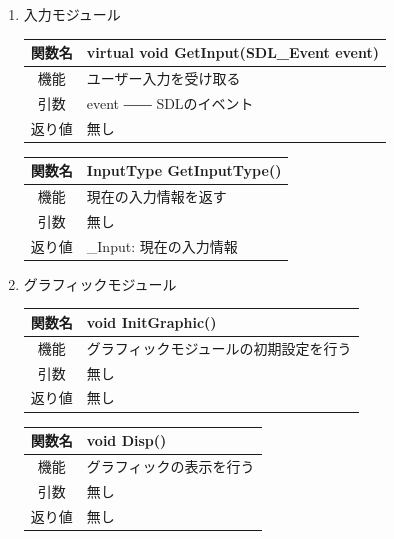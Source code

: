 \documentclass{jarticle}
\begin{document}
\begin{enumerate}
    \item 入力モジュール
    \begin{table}[H]
        \label{table:fanc_c4-1}
        \begin{center}
            \begin{tabular}{|c||p{30em}|}\hline
                関数名&virtual void GetInput(SDL\_Event event)\\\hline
                機能&ユーザー入力を受け取る\\
                引数&event ―― SDLのイベント\\
                返り値&無し\\\hline
            \end{tabular}
        \end{center}
    \end{table}
    \begin{table}[H]
        \label{table:fanc_c4-2}
        \begin{center}
            \begin{tabular}{|c||p{30em}|}\hline
                関数名&InputType GetInputType()\\\hline
                機能&現在の入力情報を返す\\
                引数&無し\\
                返り値&\_Input: 現在の入力情報\\\hline
            \end{tabular}
        \end{center}
    \end{table}
    \item グラフィックモジュール
    \begin{table}[H]
        \label{table:fanc_c5-1}
        \begin{center}
            \begin{tabular}{|c||p{30em}|}\hline
                関数名&void InitGraphic()\\\hline
                機能&グラフィックモジュールの初期設定を行う\\
                引数&無し\\
                返り値&無し\\\hline
            \end{tabular}
        \end{center}
    \end{table}
    \begin{table}[H]
        \label{table:fanc_c5-1}
        \begin{center}
            \begin{tabular}{|c||p{30em}|}\hline
                関数名&void Disp()\\\hline
                機能&グラフィックの表示を行う\\
                引数&無し\\
                返り値&無し\\\hline
            \end{tabular}
        \end{center}
    \end{table}
    
\end{enumerate}
\end{document}
